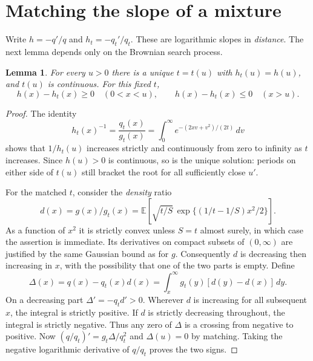 \documentclass[11pt]{article}
\newtheorem{lemma}[theorem]{Lemma}
\newcommand{\E}{\mathbb E}
\begin{document}
\section{Matching the slope of a mixture}
Write $h=-q'/q$ and $h_t=-q_t'/q_t$. These are logarithmic slopes in
\emph{distance}. The next lemma depends only on the Brownian search process.
\begin{lemma}\label{lem:match}
For every $u>0$ there is a unique $t=t(u)$ with $h_t(u)=h(u)$, and
$t(u)$ is continuous. For this fixed $t$,
\[
 h(x)-h_t(x)\ge0\quad(0<x<u),\qquad
 h(x)-h_t(x)\le0\quad(x>u).
\]
\end{lemma}
\begin{proof}
The identity
\begin{equation}\label{eq:mills}
 h_t(x)^{-1}=\frac{q_t(x)}{g_t(x)}
 =\int_0^\infty e^{-(2xv+v^2)/(2t)}\,dv
\end{equation}
shows that $1/h_t(u)$ increases strictly and continuously from zero to
infinity as $t$ increases. Since $h(u)>0$ is continuous, so is the
unique solution: periods on either side of $t(u)$ still bracket the root
for all sufficiently close $u'$.

For the matched $t$, consider the \emph{density} ratio
\[
 d(x)=g(x)/g_t(x)
 =\E\!\left[\sqrt{t/S}\,\exp\{(1/t-1/S)x^2/2\}\right].
\]
As a function of $x^2$ it is strictly convex unless $S=t$ almost surely,
in which case the assertion is immediate. Its derivatives on compact subsets
of $(0,\infty)$ are justified by the same Gaussian bound as for $g$. Consequently $d$ is decreasing
then increasing in $x$, with the possibility that one of the two parts is
empty. Define
\[
 \Delta(x)=q(x)-q_t(x)d(x)
          =\int_x^\infty g_t(y)[d(y)-d(x)]\,dy .
\]
On a decreasing part $\Delta'=-q_t d'>0$. Wherever $d$ is increasing
for all subsequent $x$, the integral is strictly positive. If $d$ is
strictly decreasing throughout, the integral is strictly negative.
Thus any zero of $\Delta$ is a crossing from negative to positive.
Now $(q/q_t)'=g_t\Delta/q_t^2$ and $\Delta(u)=0$ by matching. Taking the
negative logarithmic derivative of $q/q_t$ proves the two signs.
\end{proof}
\end{document}
